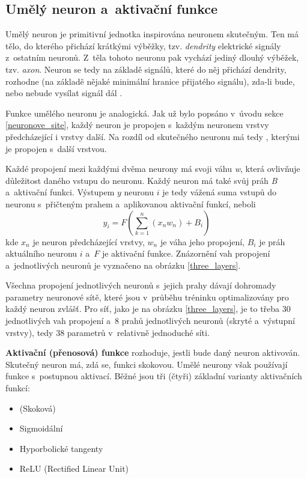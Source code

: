 \subsection{Umělý neuron a~aktivační funkce}
Umělý neuron je primitivní jednotka inspirována neuronem skutečným. Ten má tělo, do kterého přichází krátkými výběžky, tzv. \emph{dendrity} elektrické signály z~ostatním neuronů. Z~těla tohoto neuronu pak vychází jediný dlouhý výběžek, tzv. \emph{axon}. Neuron se tedy na základě signálů, které do něj přichází dendrity, rozhodne (na základě nějaké minimální hranice přijatého signálu), zda-li bude, nebo nebude vysílat signál dál \cite{wiki:neuron}.\par
Funkce umělého neuronu je analogická. Jak už bylo popsáno v~úvodu sekce \ref{neuronove_site}, každý neuron je propojen s~každým neuronem vrstvy předcházející i vrstvy další. Na rozdíl od skutečného neuronu má tedy , kterými je propojen s~další vrstvou.\par
Každé propojení mezi každými dvěma neurony má svoji váhu \emph{w}, která ovlivňuje důležitost daného vstupu do neuronu. Každý neuron má také svůj práh \emph{B} a~aktivační funkci. Výstupem $y$ neuronu $i$ je tedy vážená suma vstupů do neuronu s~přičteným prahem a~aplikovanou aktivační funkcí, neboli 
\begin{equation}
y_i = F({\sum_{k=1}^n ({x_n}w_n)} + B_i)
\end{equation}
kde $x_n$ je neuron předcházející vrstvy, $w_n$ je váha jeho propojení, $B_i$ je práh aktuálního neuronu $i$ a~$F$ je aktivační funkce. Znázornění vah propojení a~jednotlivých neuronů je vyznačeno na obrázku \ref{three_layers}.\par
Všechna propojení jednotlivých neuronů s~jejich prahy dávají dohromady parametry neuronové sítě, které jsou v~průběhu tréninku optimalizovány pro každý neuron zvlášť. Pro síť, jako je na obrázku \ref{three_layers}, je to třeba 30 jednotlivých vah propojení a~8 prahů jednotlivých neuronů (skryté a~výstupní vrstvy), tedy 38 parametrů v~relativně jednoduché síti.\par
\textbf{Aktivační (přenosová) funkce} rozhoduje, jestli bude daný neuron aktivován. Skutečný neuron má, zdá se, funkci skokovou. Umělé neurony však používají funkce s~postupnou aktivací. Běžné jsou tři (čtyři) základní varianty aktivačních funkcí: 

\begin{itemize}
    \item (Skoková)
    \item Sigmoidální
    \item Hyporbolické tangenty
    \item ReLU (Rectified Linear Unit)
\end{itemize}
\pagebreak

